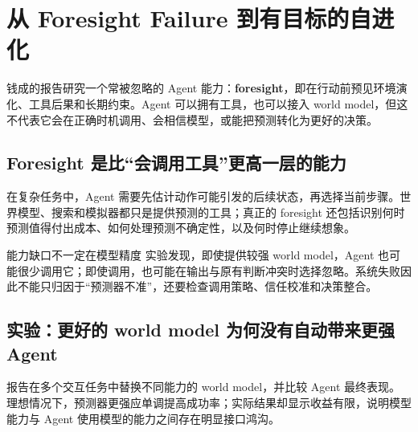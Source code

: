 \section{从 Foresight Failure 到有目标的自进化}

钱成的报告研究一个常被忽略的 Agent 能力：\textbf{foresight}，即在行动前预见环境演化、工具后果和长期约束。Agent 可以拥有工具，也可以接入 world model，但这不代表它会在正确时机调用、会相信模型，或能把预测转化为更好的决策。


\subsection{Foresight 是比“会调用工具”更高一层的能力}

在复杂任务中，Agent 需要先估计动作可能引发的后续状态，再选择当前步骤。世界模型、搜索和模拟器都只是提供预测的工具；真正的 foresight 还包括识别何时预测值得付出成本、如何处理预测不确定性，以及何时停止继续想象。



\begin{importantbox}{能力缺口不一定在模型精度}
实验发现，即使提供较强 world model，Agent 也可能很少调用它；即使调用，也可能在输出与原有判断冲突时选择忽略。系统失败因此不能只归因于“预测器不准”，还要检查调用策略、信任校准和决策整合。
\end{importantbox}

\subsection{实验：更好的 world model 为何没有自动带来更强 Agent}

报告在多个交互任务中替换不同能力的 world model，并比较 Agent 最终表现。理想情况下，预测器更强应单调提高成功率；实际结果却显示收益有限，说明模型能力与 Agent 使用模型的能力之间存在明显接口鸿沟。



